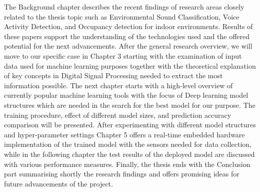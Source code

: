 
% 




The Background chapter describes the recent findings of research areas closely related to the thesis topic such as Environmental Sound Classification, Voice Activity Detection, and Occupancy detection for indoor environments. Results of these papers support the understanding of the technologies used and the offered potential for the next advancements. After the general research overview, we will move to our specific case in Chapter 3 starting with the examination of input data used for machine learning purposes together with the theoretical explanation of key concepts in Digital Signal Processing needed to extract the most information possible. The next chapter starts with a high-level overview of currently popular machine learning tools with the focus of Deep learning model structures which are needed in the search for the best model for our purpose. The training procedure, effect of different model sizes, and prediction accuracy comparison will be presented. After experimenting with different model structures and hyper-parameter settings Chapter 5 offers a real-time embedded hardware implementation of the trained model with the sensors needed for data collection, while in the following chapter the test results of the deployed model are discussed with various performance measures. Finally, the thesis ends with the Conclusion part summarising shortly the research findings and offers promising ideas for future advancements of the project.















